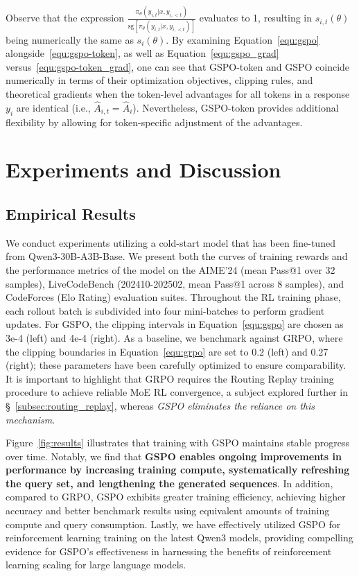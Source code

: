 Observe that the expression $\frac{ \pi_{\theta} (y_{i,t} | x, y_{i,<t}) }{ \mathrm{sg} \left[ \pi_{\theta} (y_{i,t} | x, y_{i,<t}) \right] }$ evaluates to 1, resulting in $s_{i,t}(\theta)$ being numerically the same as $s_{i}(\theta)$. By examining Equation~\eqref{equ:gspo} alongside~\eqref{equ:gspo-token}, as well as Equation~\eqref{equ:gspo_grad} versus~\eqref{equ:gspo-token_grad}, one can see that GSPO-token and GSPO coincide numerically in terms of their optimization objectives, clipping rules, and theoretical gradients when the token-level advantages for all tokens in a response $y_i$ are identical (i.e., $\widehat{A}_{i,t} = \widehat{A}_{i}$). Nevertheless, GSPO-token provides additional flexibility by allowing for token-specific adjustment of the advantages.

\section{Experiments and Discussion}

\subsection{Empirical Results}

We conduct experiments utilizing a cold-start model that has been fine-tuned from Qwen3-30B-A3B-Base. We present both the curves of training rewards and the performance metrics of the model on the AIME'24 (mean Pass@1 over 32 samples), LiveCodeBench (202410-202502, mean Pass@1 across 8 samples), and CodeForces (Elo Rating) evaluation suites. Throughout the RL training phase, each rollout batch is subdivided into four mini-batches to perform gradient updates. For GSPO, the clipping intervals in Equation~\eqref{equ:gspo} are chosen as 3e-4 (left) and 4e-4 (right). As a baseline, we benchmark against GRPO, where the clipping boundaries in Equation~\eqref{equ:grpo} are set to 0.2 (left) and 0.27 (right); these parameters have been carefully optimized to ensure comparability. It is important to highlight that GRPO requires the Routing Replay training procedure to achieve reliable MoE RL convergence, a subject explored further in \S~\ref{subsec:routing_replay}, whereas \textit{GSPO eliminates the reliance on this mechanism}.

Figure~\ref{fig:results} illustrates that training with GSPO maintains stable progress over time. Notably, we find that \textbf{GSPO enables ongoing improvements in performance by increasing training compute, systematically refreshing the query set, and lengthening the generated sequences}. In addition, compared to GRPO, GSPO exhibits greater training efficiency, achieving higher accuracy and better benchmark results using equivalent amounts of training compute and query consumption. Lastly, we have effectively utilized GSPO for reinforcement learning training on the latest Qwen3 models, providing compelling evidence for GSPO's effectiveness in harnessing the benefits of reinforcement learning scaling for large language models.

